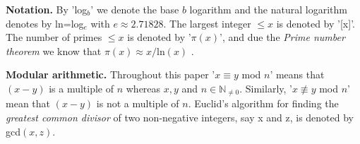 {\bf Notation.} By 'log$_b$' we denote the base $b$ logarithm and the natural logarithm denotes by ln=log$_e$ with $e \approx 2.71828$. 
The largest integer $\leq x$ is denoted by '[x]'.  The number of primes $\leq x$ is denoted by '$\pi(x)$', and due the \emph{Prime number theorem}\cite{Hardy2008}
we know that $\pi(x) \approx x / $ln$(x)$ .

{\bf Modular arithmetic.} Throughout this paper '$x \equiv y$ mod $n$' means that $(x-y)$ is a multiple of $n$ whereas $x,y$ and $n \in \mathbb{N}_{\ne 0}$.
Similarly, '$x \not\equiv y$ mod $n$' mean that $(x-y)$ is not a multiple of $n$. 
Euclid's algorithm for finding the \emph{greatest common divisor} of two non-negative integers, say x and z, is denoted by gcd$(x,z)$.
